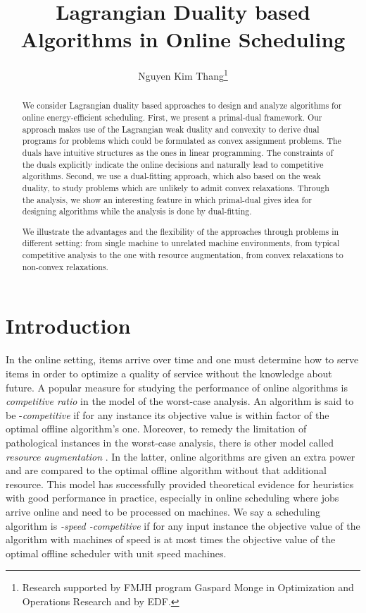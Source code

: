 \documentclass[11pt]{article}
\title{Lagrangian Duality based Algorithms in Online Scheduling}
\author{Nguyen Kim Thang\thanks{Research supported by FMJH program Gaspard Monge in Optimization and
Operations Research and by EDF.}}
\affil{IBISC, University of Evry Val d'Essonne, France }
\date{}
\begin{document}
\maketitle


\begin{abstract}
We consider Lagrangian duality based approaches to design and analyze 
algorithms for online energy-efficient scheduling. 
First, we present a primal-dual framework. 
Our approach makes use of the Lagrangian weak duality and convexity to derive 
dual programs for problems which could be formulated as convex assignment
problems. The duals have intuitive structures as the ones in linear programming.
The constraints of the duals explicitly indicate the online decisions
and naturally lead to competitive algorithms. 
Second, we use a dual-fitting approach, which also based on the weak duality, 
to study problems which are unlikely to admit convex relaxations. Through the analysis,
we show an interesting feature in which 
primal-dual gives idea for designing algorithms while the analysis 
is done by dual-fitting.

We illustrate the advantages and the flexibility of the approaches through problems 
in different setting: from single machine 
to unrelated machine environments, from typical competitive analysis to the one with
resource augmentation, from convex relaxations to non-convex relaxations.
\end{abstract}

\newpage 
\tableofcontents


\section{Introduction}	\label{sec:intro}

In the online setting, items arrive over time 
and one must determine how to serve items in order to optimize a quality of 
service without the knowledge about future. 
A popular measure for studying the performance of online algorithms is 
\emph{competitive ratio} in the model of the worst-case analysis. 
An algorithm is said to be -\emph{competitive}
if for any instance its objective value is within factor  of the optimal offline algorithm's one.  
Moreover, to remedy the limitation of pathological instances in the worst-case analysis, 
there is other model called \emph{resource augmentation} \cite{KalyanasundaramPruhs00:Speed-is-as-powerful}. 
In the latter, online algorithms are given an extra power and are compared to the optimal 
offline algorithm without that additional resource. This model has successfully provided theoretical evidence for 
heuristics with good performance in practice, especially in online scheduling where 
jobs arrive online and need to be processed on machines. 
We say a scheduling algorithm is \emph{-speed -competitive}
if for any input instance the objective value of the algorithm with machines of 
speed  is at most  times the objective value of the optimal offline scheduler
with unit speed machines. 
\end{document}
